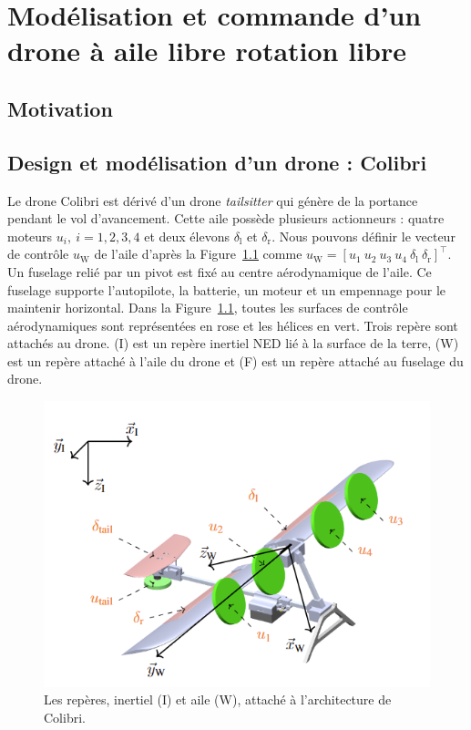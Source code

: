 
\chapter{Modélisation et commande d'un drone à aile libre rotation libre}
\minitoc
\label{chap:colibri}

\section{Motivation}
\label{sec:motivationcolibri}

\section{Design et modélisation d'un drone : Colibri}
\label{sec:model_colibri}

Le drone Colibri est dérivé d'un drone \textit{tailsitter} qui génère de la portance pendant le vol d'avancement. Cette aile possède plusieurs actionneurs : quatre moteurs $u_{i}, ~i = 1,2,3,4$ et deux élevons $\delta_{\text{l}}$ et $\delta_{\text{r}}$. Nous pouvons définir le vecteur de contrôle $u_{\text{W}}$ de l'aile d'après la Figure~\ref{fig:world_body} comme $u_{\text{W}} = [u_{1}~u_{2}~u_{3}~u_{4}~\delta_{\text{l}}~\delta_{\text{r}}]^\top$. Un fuselage relié par un pivot est fixé au centre aérodynamique de l'aile. Ce fuselage supporte l'autopilote, la batterie, un moteur et un empennage pour le maintenir horizontal. Dans la Figure~\ref{fig:world_body}, toutes les surfaces de contrôle aérodynamiques sont représentées en rose et les hélices en vert.
Trois repère sont attachés au drone. (I) est un repère inertiel NED lié à la surface de la terre, (W) est un repère attaché à l'aile du drone et (F) est un repère attaché au fuselage du drone.



\begin{figure}[ht!]
\centering
    \includegraphics[width=0.6\columnwidth,angle=0,trim={0 0 0 0.5cm},clip]{figures/wold_body.png}
    \caption{Les repères, inertiel (I) et aile (W), attaché à l'architecture de Colibri.}
    \label{fig:world_body}
\end{figure}

